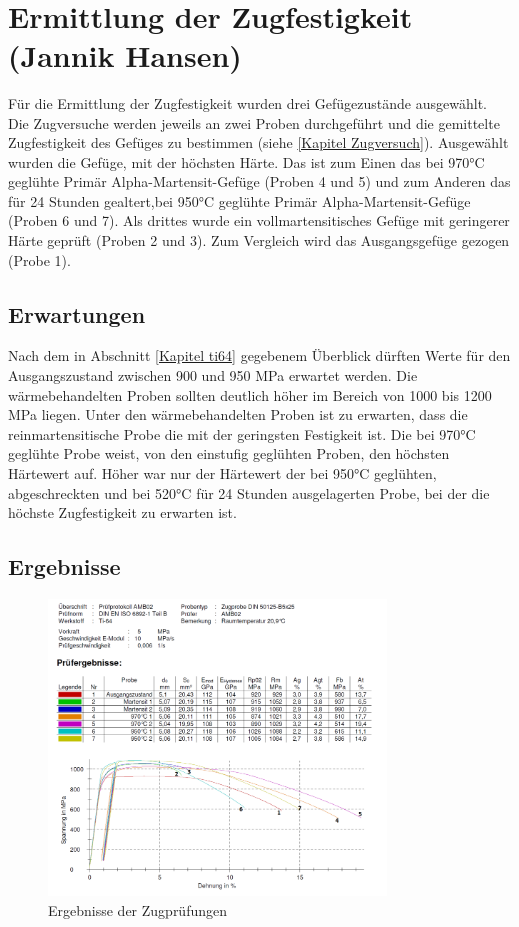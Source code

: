 \documentclass[a4paper, 11pt]{tubsreprt}
\begin{document}
\newpage
\ \\
\newpage
\section{Ermittlung der Zugfestigkeit (Jannik Hansen)}\label{Kapitel ermittlung der Zugfestigkeit}

Für die Ermittlung der Zugfestigkeit wurden drei Gefügezustände ausgewählt. Die Zugversuche werden jeweils an zwei Proben durchgeführt und die gemittelte Zugfestigkeit des Gefüges zu bestimmen (siehe  \ref{Kapitel Zugversuch}). Ausgewählt wurden die Gefüge, mit der höchsten Härte. Das ist zum Einen das bei 970°C geglühte Primär Alpha-Martensit-Gefüge (Proben 4 und 5) und zum Anderen das für 24 Stunden gealtert,bei 950°C geglühte Primär Alpha-Martensit-Gefüge (Proben 6 und 7). Als drittes wurde ein vollmartensitisches Gefüge mit geringerer Härte geprüft (Proben 2 und 3). Zum Vergleich wird das Ausgangsgefüge gezogen (Probe 1).
\subsection*{Erwartungen}
Nach dem in Abschnitt \ref{Kapitel ti64} gegebenem Überblick dürften Werte für den Ausgangszustand zwischen 900 und 950 MPa erwartet werden. Die wärmebehandelten Proben sollten deutlich höher im Bereich von 1000 bis 1200 MPa liegen. Unter den wärmebehandelten Proben ist zu erwarten, dass die reinmartensitische Probe die mit der geringsten Festigkeit ist. Die bei 970°C geglühte Probe weist, von den einstufig geglühten Proben, den höchsten Härtewert auf. Höher war nur der Härtewert der bei 950°C geglühten, abgeschreckten und bei 520°C für 24 Stunden ausgelagerten Probe, bei der die höchste Zugfestigkeit zu erwarten ist.

\subsection*{Ergebnisse}

\begin{figure}[t]
\centering
\includegraphics[angle=90, width=0.8\textwidth]{Bilder/haertepruefung.png}
\caption{Ergebnisse der Zugprüfungen}
\label{Ergebnisse der Zugpruefungen}
\end{figure}
\end{document}
